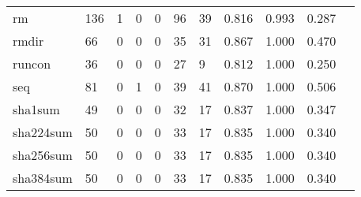 \begin{longtable}{lp{1.10cm}p{1.10cm}p{1.10cm}p{1.10cm}p{1.10cm}p{1.10cm}p{1.10cm}p{1.10cm}p{1.10cm}p{1.10cm}}
rm        &                    136 &                                  1 &                                 0 &                                0 &                                96 &                              39 &                          0.816 &                                 0.993 &                               0.287 \\
rmdir     &                     66 &                                  0 &                                 0 &                                0 &                                35 &                              31 &                          0.867 &                                 1.000 &                               0.470 \\
runcon    &                     36 &                                  0 &                                 0 &                                0 &                                27 &                               9 &                          0.812 &                                 1.000 &                               0.250 \\
seq       &                     81 &                                  0 &                                 1 &                                0 &                                39 &                              41 &                          0.870 &                                 1.000 &                               0.506 \\
sha1sum   &                     49 &                                  0 &                                 0 &                                0 &                                32 &                              17 &                          0.837 &                                 1.000 &                               0.347 \\
sha224sum &                     50 &                                  0 &                                 0 &                                0 &                                33 &                              17 &                          0.835 &                                 1.000 &                               0.340 \\
sha256sum &                     50 &                                  0 &                                 0 &                                0 &                                33 &                              17 &                          0.835 &                                 1.000 &                               0.340 \\
sha384sum &                     50 &                                  0 &                                 0 &                                0 &                                33 &                              17 &                          0.835 &                                 1.000 &                               0.340 \\

\end{longtable}
